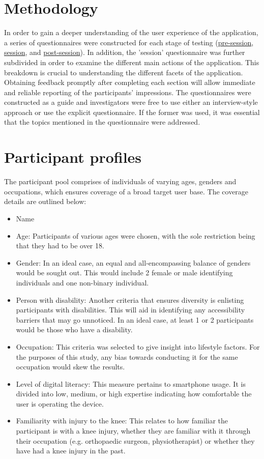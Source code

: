 \documentclass[12pt, titlepage]{article}
\begin{document}
\section{Methodology}
In order to gain a deeper understanding of the user experience of the application, a series of questionnaires were constructed
for each stage of testing (\href{Pre-sessionQuestionnaire.pdf}{pre-session}, \href{run:SessionQuestionnaire.pdf}{session}, 
and \href{Post-sessionQ.pdf}{post-session}). In addition, the 'session' questionnaire was further subdivided
in order to examine the different main actions of the application. This breakdown is crucial
to understanding the different facets of the application. Obtaining feedback promptly after completing each section will 
allow immediate and reliable reporting of the participants' impressions. The questionnaires were constructed as a guide and 
investigators were free to use either an interview-style approach or use the explicit questionnaire. If the former was used, 
it was essential that the topics mentioned in the questionnaire were addressed. 



\section{Participant profiles}
The participant pool comprises of individuals of varying ages, genders and occupations, which ensures coverage of 
a broad target user base. The coverage details are outlined below:
\begin{itemize}
    \item Name
    \item Age: Participants of various ages were chosen, with the sole restriction being that they had to be over 18.
    \item Gender: In an ideal case, an equal and all-encompassing balance of genders would be sought out. This would include 2 female 
    or male identifying individuals and one non-binary individual.
    \item Person with disability: Another criteria that ensures diversity is enlisting participants with disabilities. This will aid in
    identifying any accessibility barriers that may go unnoticed. In an ideal case, at least 1 or 2 participants would be those who have a disability.
    \item Occupation: This criteria was selected to give insight into lifestyle factors. For the purposes of this study, any bias towards conducting 
    it for the same occupation would skew the results.
    \item Level of digital literacy: This measure pertains to smartphone usage. It is divided into low, medium, or high expertise indicating 
    how comfortable the user is operating the device.
    \item Familiarity with injury to the knee: This relates to how familiar the participant is with a knee injury, whether they 
    are familiar with it through their occupation (e.g. orthopaedic surgeon, physiotherapist) or whether they have had a knee injury in the past.
\end{itemize}
\end{document}
